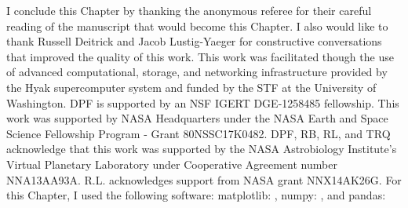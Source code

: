 I conclude this Chapter by thanking the anonymous referee for their careful reading of the manuscript that would become this Chapter.  I also would like to thank Russell Deitrick and Jacob Lustig-Yaeger for constructive conversations that improved the quality of this work.  This work was facilitated though the use of advanced computational, storage, and networking infrastructure provided by the Hyak supercomputer system and funded by the STF at the University of Washington. DPF is supported by an NSF IGERT DGE-1258485 fellowship.  This work was supported by NASA Headquarters under the NASA Earth and Space Science Fellowship Program - Grant 80NSSC17K0482.  DPF, RB, RL, and TRQ acknowledge that this work was supported by the NASA Astrobiology Institute's Virtual Planetary Laboratory under Cooperative Agreement number NNA13AA93A. R.L. acknowledges support from NASA grant NNX14AK26G. For this Chapter, I used the following software: matplotlib: \citet{Hunter2007}, numpy: \citet{vanderWalt2011}, and pandas: \citet{Mckinney2010}






